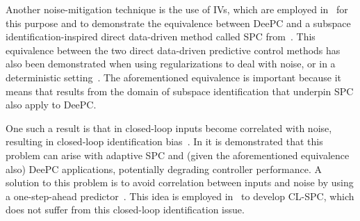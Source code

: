 Another noise-mitigation technique is the use of \ac{IVs}, which are employed in~\citep{vanWingerden2022} for this purpose and to demonstrate the equivalence between \ac{DeePC} and a subspace identification-inspired direct data-driven method called \ac{SPC} from~\cite{Favoreel1999}. This equivalence between the two direct data-driven predictive control methods has  also been demonstrated when using regularizations to deal with noise, or in a deterministic setting~\citep{Fiedler2021}. The aforementioned equivalence is important because it means that results from the domain of subspace identification that underpin \ac{SPC} also apply to \ac{DeePC}.
% 

One such a result is that in closed-loop inputs become correlated with noise, resulting in closed-loop identification bias~\citep{Soderstrom1989a}. In \cite{Dinkla2023} it is demonstrated that this problem can arise with adaptive \ac{SPC} and (given the aforementioned equivalence also) \ac{DeePC} applications, potentially degrading controller performance. %
A solution to this problem is to avoid correlation between inputs and noise by using a one-step-ahead predictor~\citep{Ljung1996}. This idea is employed in~\cite{Dong2008} to develop \ac{CL-SPC}, which does not suffer from this closed-loop identification issue.

